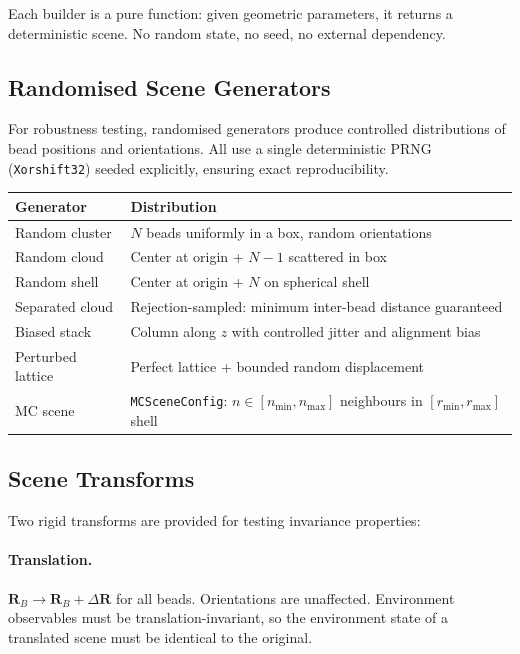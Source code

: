 \documentclass[11pt]{article}
\newcommand{\type}[1]{\texttt{#1}}
\begin{document}
Each builder is a pure function: given geometric parameters, it returns a
deterministic scene.  No random state, no seed, no external dependency.

\subsection{Randomised Scene Generators}

For robustness testing, randomised generators produce controlled
distributions of bead positions and orientations.  All use a single
deterministic PRNG (\type{Xorshift32}) seeded explicitly, ensuring exact
reproducibility.

\begin{center}
\begin{tabular}{lp{8cm}}
    \textbf{Generator} & \textbf{Distribution} \\
    \midrule
    Random cluster    & $N$ beads uniformly in a box, random orientations \\
    Random cloud      & Center at origin + $N{-}1$ scattered in box \\
    Random shell      & Center at origin + $N$ on spherical shell \\
    Separated cloud   & Rejection-sampled: minimum inter-bead distance guaranteed \\
    Biased stack      & Column along $z$ with controlled jitter and alignment bias \\
    Perturbed lattice & Perfect lattice + bounded random displacement \\
    MC scene          & \type{MCSceneConfig}: $n \in [n_{\min}, n_{\max}]$
                        neighbours in $[r_{\min}, r_{\max}]$ shell \\
\end{tabular}
\end{center}

\subsection{Scene Transforms}

Two rigid transforms are provided for testing invariance properties:

\paragraph{Translation.}
$\mathbf{R}_B \to \mathbf{R}_B + \Delta\mathbf{R}$ for all beads.
Orientations are unaffected.  Environment observables must be
translation-invariant, so the environment state of a translated scene must
be identical to the original.
\end{document}
